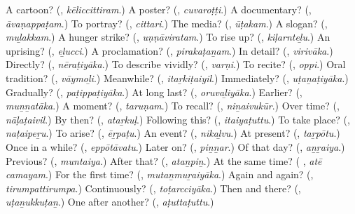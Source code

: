\begin{tcolorbox}[breakable,colback=teal!4,colframe=teal!35!black,title={Before you move on}]
A cartoon? (\textbf{}, \emph{kēliccittiram}.) A poster? (\textbf{}, \emph{cuvaroṭṭi}.) A documentary? (\textbf{}, \emph{āvaṇappaṭam}.) To portray? (\textbf{}, \emph{cittari}.) The media? (\textbf{}, \emph{ūṭakam}.) A slogan? (\textbf{}, \emph{muḻakkam}.) A hunger strike? (\textbf{}, \emph{uṇṇāviratam}.) To rise up? (\textbf{}, \emph{kiḷarnteḻu}.) An uprising? (\textbf{}, \emph{eḻucci}.) A proclamation? (\textbf{}, \emph{pirakaṭaṉam}.) In detail? (\textbf{}, \emph{virivāka}.) Directly? (\textbf{}, \emph{nēraṭiyāka}.) To describe vividly? (\textbf{}, \emph{varṇi}.) To recite? (\textbf{}, \emph{oppi}.) Oral tradition? (\textbf{}, \emph{vāymoḻi}.) Meanwhile? (\textbf{}, \emph{itaṟkiṭaiyil}.) Immediately? (\textbf{}, \emph{uṭaṉaṭiyāka}.) Gradually? (\textbf{}, \emph{paṭippaṭiyāka}.) At long last? (\textbf{}, \emph{oruvaḻiyāka}.) Earlier? (\textbf{}, \emph{muṉṉatāka}.) A moment? (\textbf{}, \emph{taruṇam}.) To recall? (\textbf{}, \emph{niṉaivukūr}.) Over time? (\textbf{}, \emph{nāḷaṭaivil}.) By then? (\textbf{}, \emph{ataṟkuḷ}.) Following this? (\textbf{}, \emph{itaiyaṭuttu}.) To take place? (\textbf{}, \emph{naṭaipeṟu}.) To arise? (\textbf{}, \emph{ēṟpaṭu}.) An event? (\textbf{}, \emph{nikaḻvu}.) At present? (\textbf{}, \emph{taṟpōtu}.) Once in a while? (\textbf{}, \emph{eppōtāvatu}.) Later on? (\textbf{}, \emph{piṉṉar}.) Of that day? (\textbf{}, \emph{aṉṟaiya}.) Previous? (\textbf{}, \emph{muntaiya}.) After that? (\textbf{}, \emph{ataṉpiṉ}.) At the same time? (\textbf{ }, \emph{atē camayam}.) For the first time? (\textbf{}, \emph{mutaṉmuṟaiyāka}.) Again and again? (\textbf{}, \emph{tirumpattirumpa}.) Continuously? (\textbf{}, \emph{toṭarcciyāka}.) Then and there? (\textbf{}, \emph{uṭaṉukkuṭaṉ}.) One after another? (\textbf{}, \emph{aṭuttaṭuttu}.)
\end{tcolorbox}
